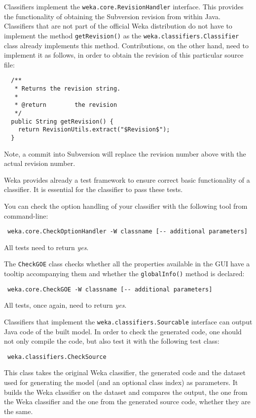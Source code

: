 \label{classifier_revisions}
Classifiers implement the \texttt{weka.core.RevisionHandler} interface. This
provides the functionality of obtaining the Subversion revision from within
Java. Classifiers that are not part of the official Weka distribution
do not have to implement the method \texttt{getRevision()} as the
\texttt{weka.classifiers.Classifier} class already implements this method.
Contributions, on the other hand, need to implement it as follows, in order to
obtain the revision of this particular source file:
\begin{verbatim}
  /**
   * Returns the revision string.
   *
   * @return        the revision
   */
  public String getRevision() {
    return RevisionUtils.extract("$Revision$");
  }
\end{verbatim}
Note, a commit into Subversion will replace the revision number above with the
actual revision number.

Weka provides already a test framework to ensure correct basic functionality of
a classifier. It is essential for the classifier to pass these tests.

You can check the option handling of your classifier with the following tool
from command-line:
\begin{verbatim}
 weka.core.CheckOptionHandler -W classname [-- additional parameters]
\end{verbatim}
All tests need to return \textit{yes}.

The \texttt{CheckGOE} class checks whether all the properties available in the
GUI have a tooltip accompanying them and whether the \texttt{globalInfo()}
method is declared:
\begin{verbatim}
 weka.core.CheckGOE -W classname [-- additional parameters]
\end{verbatim}
All tests, once again, need to return \textit{yes}.

Classifiers that implement the \texttt{weka.classifiers.Sourcable} interface can
output Java code of the built model. In order to check the generated  code, one
should not only compile the code, but also test it with the following test
class:
\begin{verbatim}
 weka.classifiers.CheckSource
\end{verbatim}
This class takes the original Weka classifier, the generated code and the
dataset used for generating the model (and an optional class index) as
parameters. It builds the Weka classifier on the dataset and compares the
output, the one from the Weka classifier and the one from the generated source
code, whether they are the same.

